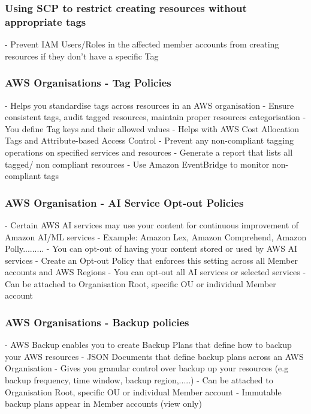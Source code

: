 \documentclass[11pt]{book}
\begin{document}

    \subsubsection{Using SCP to restrict creating resources without appropriate tags}
    - Prevent IAM Users/Roles in the affected member accounts from creating resources if they don't have a specific Tag

    \subsubsection{AWS Organisations - Tag Policies}
    - Helps you standardise tags across resources in an AWS organisation
    - Ensure consistent tags, audit tagged resources, maintain proper resources categorisation
    - You define Tag keys and their allowed values
    - Helps with AWS Cost Allocation Tags and Attribute-based Access Control
    - Prevent any non-compliant tagging operations on specified services and resources
    - Generate a report that lists all tagged/ non compliant resources
    - Use Amazon EventBridge to monitor non-compliant tags

    \subsubsection{AWS Organisation - AI Service Opt-out Policies}
    - Certain AWS AI services may use your content for continuous improvement of Amazon AI/ML services
    - Example: Amazon Lex, Amazon Comprehend, Amazon Polly.........
    - You can opt-out of having your content stored or used by AWS AI services
    - Create an Opt-out Policy that enforces this setting across all Member accounts and AWS Regions
    - You can opt-out all AI services or selected services
    - Can be attached to Organisation Root, specific OU or individual Member account

    \subsubsection{AWS Organisations - Backup policies}
    - AWS Backup enables you to create Backup Plans that define how to backup your AWS resources
    - JSON Documents that define backup plans across an AWS Organisation
    - Gives you granular control over backup up your resources (e.g backup frequency, time window, backup region,.....)
    - Can be attached to Organisation Root, specific OU or individual Member account
    - Immutable backup plans appear in Member accounts (view only)
\end{document}
